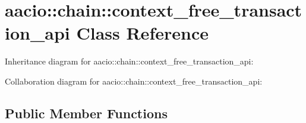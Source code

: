 \hypertarget{classaacio_1_1chain_1_1context__free__transaction__api}{}\section{aacio\+:\+:chain\+:\+:context\+\_\+free\+\_\+transaction\+\_\+api Class Reference}
\label{classaacio_1_1chain_1_1context__free__transaction__api}


Inheritance diagram for aacio\+:\+:chain\+:\+:context\+\_\+free\+\_\+transaction\+\_\+api\+:


Collaboration diagram for aacio\+:\+:chain\+:\+:context\+\_\+free\+\_\+transaction\+\_\+api\+:
\subsection*{Public Member Functions}
